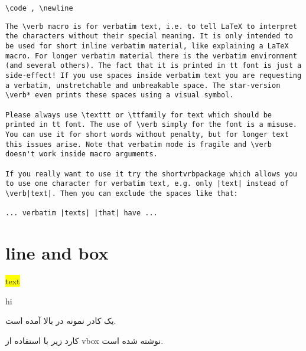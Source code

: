 \documentclass[12pt]{article}
\begin{document}
\begin{latin}
\hlineshort

\verb|\code , \newline |

\hlineshort[5cm]

\begin{Verbatim}[breaklines=true]
The \verb macro is for verbatim text, i.e. to tell LaTeX to interpret the characters without their special meaning. It is only intended to be used for short inline verbatim material, like explaining a LaTeX macro. For longer verbatim material there is the verbatim environment (and several others). The fact that it is printed in tt font is just a side-effect! If you use spaces inside verbatim text you are requesting a verbatim, unstretchable and unbreakable space. The star-version \verb* even prints these spaces using a visual symbol.

Please always use \texttt or \ttfamily for text which should be printed in tt font. The use of \verb simply for the font is a misuse. You can use it for short words without penalty, but for longer text this issues arise. Note that verbatim mode is fragile and \verb doesn't work inside macro arguments.

If you really want to use it try the shortvrbpackage which allows you to use one character for verbatim text, e.g. only |text| instead of  \verb|text|. Then you can exclude the spaces like that:

... verbatim |texts| |that| have ...
\end{Verbatim}
\end{latin}	

\section{line and box}
\hlineshort



\colorbox{yellow}{text}

{\color{red}
}

hi


یک کادر نمونه در بالا آمده است.

کارد زیر با استفاده از vbox نوشته شده است.

\textbox[green]{\vbox{\noindent\ptext[1]}}


\hlinelong
\theend
\end{document}
